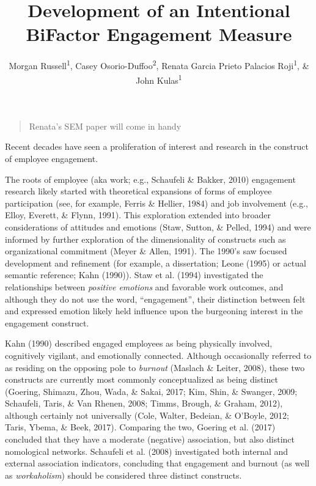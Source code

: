 \documentclass[
  english,
  man]{apa6}
\title{Development of an Intentional BiFactor Engagement Measure}
\author{Morgan Russell\textsuperscript{1}, Casey Osorio-Duffoo\textsuperscript{2}, Renata Garcia Prieto Palacios Roji\textsuperscript{1}, \& John Kulas\textsuperscript{1}}
\date{}
\affiliation{\vspace{0.5cm}\textsuperscript{1} Montclair State University\\\textsuperscript{2} Harver}
\begin{document}
\maketitle

\begin{quote}
Renata's SEM paper will come in handy
\end{quote}

Recent decades have seen a proliferation of interest and research in the construct of employee engagement.

The roots of employee (aka work; e.g., Schaufeli \& Bakker, 2010) engagement research likely started with theoretical expansions of forms of employee participation (see, for example, Ferris \& Hellier, 1984) and job involvement (e.g., Elloy, Everett, \& Flynn, 1991). This exploration extended into broader considerations of attitudes and emotions (Staw, Sutton, \& Pelled, 1994) and were informed by further exploration of the dimensionality of constructs such as organizational commitment (Meyer \& Allen, 1991). The 1990's saw focused development and refinement (for example, a dissertation; Leone (1995) or actual semantic reference; Kahn (1990)). Staw et al. (1994) investigated the relationships between \emph{positive emotions} and favorable work outcomes, and although they do not use the word, \enquote{engagement}, their distinction between felt and expressed emotion likely held influence upon the burgeoning interest in the engagement construct.

Kahn (1990) described engaged employees as being physically involved, cognitively vigilant, and emotionally connected. Although occasionally referred to as residing on the opposing pole to \emph{burnout} (Maslach \& Leiter, 2008), these two constructs are currently most commonly conceptualized as being distinct (Goering, Shimazu, Zhou, Wada, \& Sakai, 2017; Kim, Shin, \& Swanger, 2009; Schaufeli, Taris, \& Van Rhenen, 2008; Timms, Brough, \& Graham, 2012), although certainly not universally (Cole, Walter, Bedeian, \& O'Boyle, 2012; Taris, Ybema, \& Beek, 2017). Comparing the two, Goering et al. (2017) concluded that they have a moderate (negative) association, but also distinct nomological networks. Schaufeli et al. (2008) investigated both internal and external association indicators, concluding that engagement and burnout (as well as \emph{workaholism}) should be considered three distinct constructs.
\end{document}

